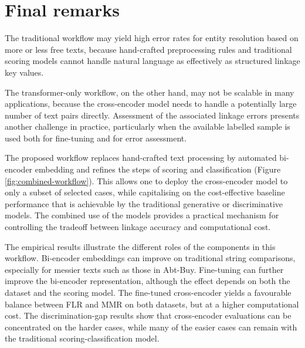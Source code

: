 \section{Final remarks}
\label{sec:final-remarks}

The traditional workflow may yield high error rates for entity resolution based on more or
less free texts, because hand-crafted preprocessing rules and traditional scoring models
cannot handle natural language as effectively as structured linkage key values.

The transformer-only workflow, on the other hand, may not be scalable in many
applications, because the cross-encoder model needs to handle a potentially large number
of text pairs directly. Assessment of the associated linkage errors presents another
challenge in practice, particularly when the available labelled sample is used both for
fine-tuning and for error assessment.

The proposed workflow replaces hand-crafted text processing by automated bi-encoder
embedding and refines the steps of scoring and classification (Figure
\ref{fig:combined-workflow}). This allows one to deploy the cross-encoder model to only
a subset of selected cases, while capitalising on the cost-effective baseline performance
that is achievable by the traditional generative or discriminative models. The combined use of the models provides a practical mechanism for controlling
the tradeoff between linkage accuracy and computational cost.

The empirical results illustrate the different roles of the components in this workflow.
Bi-encoder embeddings can improve on traditional string comparisons, especially for
messier texts such as those in Abt-Buy. Fine-tuning can further improve the bi-encoder
representation, although the effect depends on both the dataset and the scoring model.
The fine-tuned cross-encoder yields a favourable balance between FLR and MMR on both
datasets, but at a higher computational cost. The discrimination-gap results show that cross-encoder evaluations can be
concentrated on the harder cases, while many of the easier cases can remain with the
traditional scoring-classification model. 


